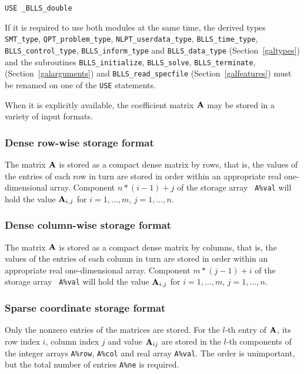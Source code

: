 \documentclass{galahad}
\newcommand{\packagename}{BLLS}
\newcommand{\fullpackagename}{\libraryname\_\packagename}
\begin{document}
\medskip{}

\hspace{8mm} {\tt USE  \fullpackagename\_double}

\medskip

\noindent
If it is required to use both modules at the same time, the derived types
{\tt SMT\_type},
{\tt QPT\_problem\_type},
{\tt NLPT\_userdata\-\_type},
{\tt \packagename\_time\_type},
{\tt \packagename\_control\_type},
{\tt \packagename\_inform\_type}
and
{\tt \packagename\_data\_type}
(Section~\ref{galtypes})
and the subroutines
{\tt \packagename\_initialize},
{\tt \packagename\_\-solve},
{\tt \packagename\_terminate},
(Section~\ref{galarguments})
and
{\tt \packagename\_read\_specfile}
(Section~\ref{galfeatures})
must be renamed on one of the {\tt USE} statements.


\galmatrix
When it is explicitly available,
the coefficient matrix ${\mathbf{A}}$ may be stored in a variety of input formats.

\subsubsection{Dense row-wise storage format}\label{dense-row}
The matrix ${\mathbf{A}}$ is stored as a compact dense matrix by rows,
that is, the values of the entries of each row in turn are
stored in order within an appropriate real one-dimensional array.
Component $n \ast (i-1) + j$ of the storage array {\tt
  A\%val} will hold the value ${\mathbf{A}}_{i,j}$ for $i = 1, \ldots , m$, $j =
1, \ldots , n$.

\subsubsection{Dense column-wise storage format}\label{dense-column}
The matrix ${\mathbf{A}}$ is stored as a compact
dense matrix by columns, that is, the values of the entries of each column
in turn are stored in order within an appropriate real one-dimensional array.
Component $m \ast (j-1) + i$ of the storage array {\tt
  A\%val} will hold the value ${\mathbf{A}}_{i,j}$ for $i = 1, \ldots , m$, $j =
1, \ldots , n$.

\subsubsection{Sparse coordinate storage format}\label{coordinate}
Only the nonzero entries of the matrices are stored. For the $l$-th
entry of ${\mathbf{A}}$, its row index $i$, column index $j$ and value
${\mathbf{A}}_{ij}$ are stored in the $l$-th components of the integer arrays
{\tt A\%row}, {\tt A\%col} and real array {\tt A\%val}.
The order is unimportant, but the total number of entries {\tt A\%ne} is
required.
\end{document}
